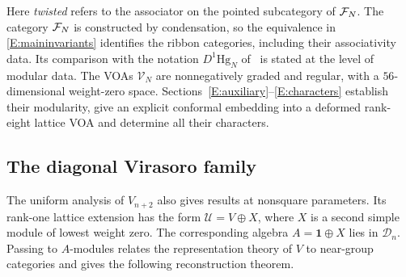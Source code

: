 \documentclass[11pt]{article}
\newcommand{\one}{\mathbf1}\newcommand{\D}{\mathcal D}\newcommand{\Dcat}{\mathcal D}
\numberwithin{equation}{section}
\begin{document}
Here \emph{twisted} refers to the associator on the pointed subcategory of $\mathcal F_N$. The category $\mathcal F_N$ is constructed by condensation, so the equivalence in \eqref{E:maininvariants} identifies the ribbon categories, including their associativity data. Its comparison with the notation $D^1\mathrm{Hg}_N$ of~\cite{B:EG11} is stated at the level of modular data. The VOAs $\mathscr{V}_N$ are nonnegatively graded and regular, with a $56$-dimensional weight-zero space. Sections~\ref{E:auxiliary}--\ref{E:characters} establish their modularity, give an explicit conformal embedding into a deformed rank-eight lattice VOA and determine all their characters.

\subsection*{The diagonal Virasoro family}
The uniform analysis of $V_{n+2}$ also gives results at nonsquare parameters. Its rank-one lattice extension has the form $\mathcal U=V\oplus X$, where $X$ is a second simple module of lowest weight zero. The corresponding algebra $A=\one\oplus X$ lies in $\D_n$. Passing to $A$-modules relates the representation theory of $V$ to near-group categories and gives the following reconstruction theorem.
\end{document}
